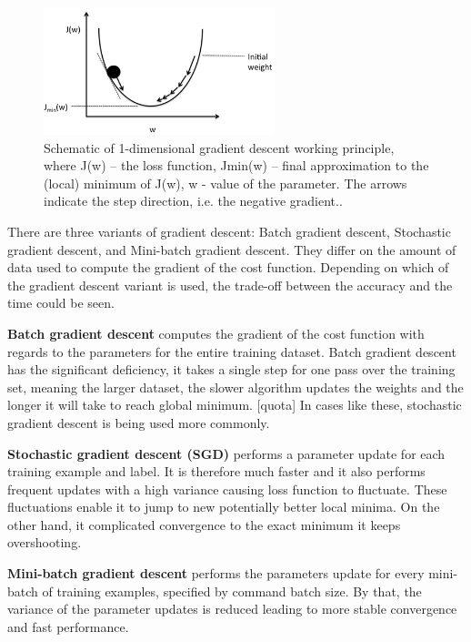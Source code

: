 \begin{figure} [H]
\centering
\includegraphics[width=0.6\textwidth]{figures/GDgraph}
\caption{Schematic of 1-dimensional gradient descent working principle, where J(w) – the loss function, Jmin(w) – final approximation to the (local) minimum of J(w), w - value of the parameter. The arrows indicate the step direction, i.e. the negative gradient.\citep{Raschka2016}.}
\label{fig:GDgraph}  
\end{figure}

There are three variants of gradient descent: Batch gradient descent, Stochastic gradient descent, and Mini-batch gradient descent. They differ on the amount of data used to compute the gradient of the cost function. Depending on which of the gradient descent variant is used, the trade-off between the accuracy and the time could be seen.

\noindent
\textbf{Batch gradient descent} computes the gradient of the cost function with regards to the parameters for the entire training dataset.\citep{Ruder2016} Batch gradient descent has the significant deficiency, it takes a single step for one pass over the training set, meaning the larger dataset, the slower algorithm updates the weights and the longer it will take to reach global minimum. [quota] In cases like these, stochastic gradient descent is being used more commonly.

\noindent
\textbf{Stochastic gradient descent (SGD)} performs a parameter update for each training example and label. It is therefore much faster and it also performs frequent updates with a high variance causing loss function to fluctuate. These fluctuations enable it to jump to new potentially better local minima. On the other hand, it complicated convergence to the exact minimum it keeps overshooting.\citep{Zhang2014}

\noindent
\textbf{Mini-batch gradient descent} performs the parameters update for every mini-batch of training examples, specified by command batch size. By that, the variance of the parameter updates is reduced leading to more stable convergence and fast performance.\citep{Ruder2016}


